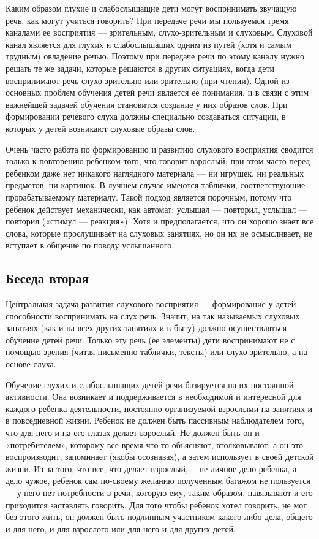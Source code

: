 \documentclass{book}
\begin{document}
Каким образом глухие и слабослышащие дети могут воспринимать звучащую
речь, как могут учиться говорить? При передаче речи мы пользуемся тремя
каналами ее восприятия --- зрительным, слухо-зрительным и слуховым.
Слуховой канал является для глухих и слабослышащих одним из путей (хотя
и самым трудным) овладение речью. Поэтому при передаче речи по этому
каналу нужно решать те же задачи, которые решаются в других ситуациях,
когда дети воспринимают речь слухо-зрительно или зрительно (при чтении).
Одной из основных проблем обучения детей речи является ее понимания, и в
связи с этим важнейшей задачей обучения становится создание у них
образов слов. При формировании речевого слуха должны специально
создаваться ситуации, в которых у детей возникают слуховые образы слов.

Очень часто работа по формированию и развитию слухового восприятия
сводится только к повторению ребенком того, что говорит взрослый; при
этом часто перед ребенком даже нет никакого наглядного материала --- ни
игрушек, ни реальных предметов, ни картинок. В лучшем случае имеются
таблички, соответствующие прорабатываемому материалу. Такой подход
является порочным, потому что ребенок действует механически, как
автомат: услышал --- повторил, услышал --- повторил («стимул ---
реакция»). Хотя и предполагается, что он хорошо знает все слова, которые
прослушивает на слуховых занятиях, но он их не осмысливает, не вступает
в общение по поводу услышанного.

\subsection*{Беседа вторая}

Центральная задача развития слухового восприятия --- формирование у
детей способности воспринимать на слух речь. Значит, на так называемых
слуховых занятиях (как и на всех других занятиях и в быту) должно
осуществляться обучение детей речи. Только эту речь (ее элементы) дети
воспринимают не с помощью зрения (читая письменно таблички, тексты) или
слухо-зрительно, а на основе слуха.

Обучение глухих и слабослышащих детей речи базируется на их постоянной
активности. Она возникает и поддерживается в необходимой и интересной
для каждого ребенка деятельности, постоянно организуемой взрослыми на
занятиях и в повседневной жизни. Ребенок не должен быть пассивным
наблюдателем того, что для него и на его глазах делает взрослый. Не
должен быть он и «потребителем», которому все время что-то объясняют,
втолковывают, а он это воспроизводит, запоминает (якобы осознавая), а
затем использует в своей детской жизни. Из-за того, что все, что делает
взрослый,--- не личное дело ребенка, а дело чужое, ребенок сам по-своему
желанию полученным багажом не пользуется --- у него нет потребности в
речи, которую ему, таким образом, навязывают и его приходится заставлять
говорить. Для того чтобы ребенок хотел говорить, не мог без этого жить,
он должен быть подлинным участником какого-либо дела, общего и для него,
и для взрослого или для него и для других детей.
\end{document}

